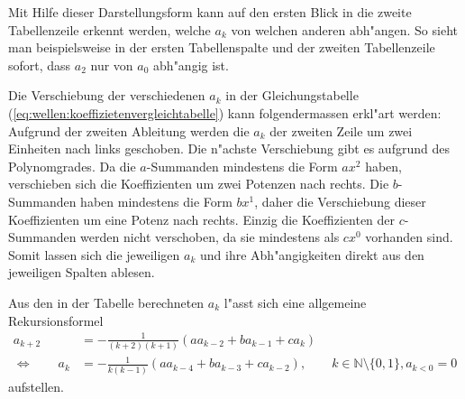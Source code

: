 Mit Hilfe dieser Darstellungsform kann auf den ersten Blick in die zweite 
Tabellenzeile erkennt werden, welche $a_k$ von welchen anderen abh"angen. So 
sieht man beispielsweise in der ersten Tabellenspalte und der zweiten 
Tabellenzeile sofort, dass $a_2$ nur von $a_0$ abh"angig ist.

Die Verschiebung der verschiedenen $a_k$ in der Gleichungstabelle 
(\ref{eq:wellen:koeffizietenvergleichtabelle}) kann folgendermassen erkl"art 
werden: Aufgrund der zweiten Ableitung werden die $a_k$ der zweiten Zeile um 
zwei Einheiten nach links geschoben. Die n"achste Verschiebung gibt es aufgrund 
des Polynomgrades. Da die $a$-Summanden mindestens die Form $ax^2$ haben, 
verschieben sich die Koeffizienten um zwei Potenzen nach rechts. Die 
$b$-Summanden haben mindestens die Form $bx^1$, daher die Verschiebung dieser 
Koeffizienten um eine Potenz nach rechts. Einzig die Koeffizienten der 
$c$-Summanden werden nicht verschoben, da sie mindestens als $cx^0$ vorhanden 
sind. Somit lassen sich die jeweiligen $a_k$ und ihre Abh"angigkeiten direkt 
aus den jeweiligen Spalten ablesen.

Aus den in der Tabelle berechneten $a_k$ l"asst sich eine allgemeine 
Rekursionsformel
\begin{equation*}
	\begin{split}
		a_{k+2} &= -\frac{1}{(k+2)(k+1)} (aa_{k-2}+ba_{k-1}+ca_k) \\
		\Leftrightarrow \qquad
		a_k &= -\frac{1}{k(k-1)} (aa_{k-4}+ba_{k-3}+ca_{k-2}), \qquad k \in 
		\mathbb{N} \setminus \{0, 1\}, a_{k<0} = 0
	\end{split}
\end{equation*}
aufstellen.